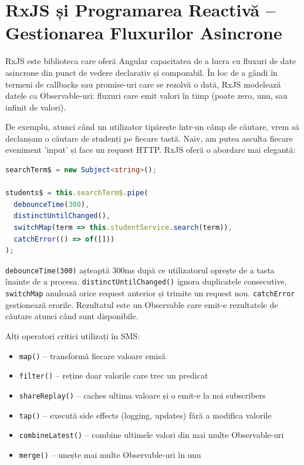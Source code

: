 \section{RxJS și Programarea Reactivă – Gestionarea Fluxurilor Asincrone}

RxJS este biblioteca care oferă Angular capacitatea de a lucra cu fluxuri de date asincrone din punct de vedere declarativ și compozabil. În loc de a gândi în termeni de callbacks sau promise-uri care se rezolvă o dată, RxJS modelează datele ca Observable-uri: fluxuri care emit valori în timp (poate zero, unu, sau infinit de valori).

De exemplu, atunci când un utilizator tipărește într-un câmp de căutare, vrem să declanșam o căutare de studenți pe fiecare tastă. Naiv, am putea asculta fiecare eveniment 'input' și face un request HTTP. RxJS oferă o abordare mai elegantă:

\begin{lstlisting}[language=TypeScript]
searchTerm$ = new Subject<string>();

students$ = this.searchTerm$.pipe(
  debounceTime(300),
  distinctUntilChanged(),
  switchMap(term => this.studentService.search(term)),
  catchError(() => of([]))
);
\end{lstlisting}

\texttt{debounceTime(300)} așteaptă 300ms după ce utilizatorul oprește de a tasta înainte de a procesa. \texttt{distinctUntilChanged()} ignora duplicatele consecutive. \texttt{switchMap} anulează orice request anterior și trimite un request nou. \texttt{catchError} gestionează erorile. Rezultatul este un Observable care emit-e rezultatele de căutare atunci când sunt disponibile.

Alți operatori critici utilizați în SMS:

\begin{itemize}
  \item \texttt{map()} – transformă fiecare valoare emisă
  \item \texttt{filter()} – reține doar valorile care trec un predicat
  \item \texttt{shareReplay()} – caches ultima valoare și o emit-e la noi subscribers
  \item \texttt{tap()} – execută side effects (logging, updates) fără a modifica valorile
  \item \texttt{combineLatest()} – combine ultimele valori din mai multe Observable-uri
  \item \texttt{merge()} – unește mai multe Observable-uri în unu
\end{itemize}

